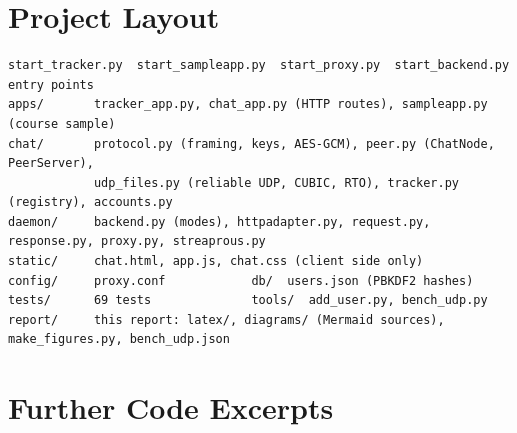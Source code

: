\section{Project Layout}\label{app:layout}
\begin{lstlisting}[style=text, caption={Source tree}, label={lst:tree}]
start_tracker.py  start_sampleapp.py  start_proxy.py  start_backend.py   entry points
apps/       tracker_app.py, chat_app.py (HTTP routes), sampleapp.py (course sample)
chat/       protocol.py (framing, keys, AES-GCM), peer.py (ChatNode, PeerServer),
            udp_files.py (reliable UDP, CUBIC, RTO), tracker.py (registry), accounts.py
daemon/     backend.py (modes), httpadapter.py, request.py, response.py, proxy.py, streaprous.py
static/     chat.html, app.js, chat.css (client side only)
config/     proxy.conf            db/  users.json (PBKDF2 hashes)
tests/      69 tests              tools/  add_user.py, bench_udp.py
report/     this report: latex/, diagrams/ (Mermaid sources), make_figures.py, bench_udp.json
\end{lstlisting}

\section{Further Code Excerpts}\label{app:code}
